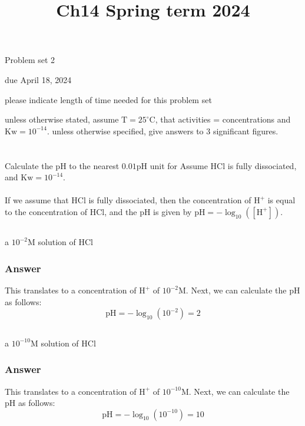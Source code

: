 \documentclass[12pt]{article}
\title{Ch14 Spring term 2024 }
\author{}
\date{}
\begin{document}
\maketitle
Problem set 2

due April 18, 2024

please indicate length of time needed for this problem set

unless otherwise stated, assume $\mathrm{T}=25^{\circ} \mathrm{C}$, that activities = concentrations and $\mathrm{Kw}=10^{-14}$. unless otherwise specified, give answers to 3 significant figures.
\section{}
Calculate the $\mathrm{pH}$ to the nearest $0.01 \mathrm{pH}$ unit for
Assume $\mathrm{HCl}$ is fully dissociated, and $\mathrm{Kw}=10^{-14}$.\\\\
If we assume that $\mathrm{HCl}$ is fully dissociated, then the concentration of $\mathrm{H}^{+}$ is equal to the concentration of $\mathrm{HCl}$, and the $\mathrm{pH}$ is given by $\mathrm{pH}=-\log _{10}\left(\left[\mathrm{H}^{+}\right]\right)$.
\subsection{}
a $10^{-2} \mathrm{M}$ solution of $\mathrm{HCl}$
\subsubsection{Answer}
This translates to a concentration of $\mathrm{H}^{+}$ of $10^{-2} \mathrm{M}$. Next, we can calculate the $\mathrm{pH}$ as follows:
\begin{equation}
  \mathrm{pH}=-\log _{10}\left(10^{-2}\right)=2
\end{equation}
\subsection{}
a $10^{-10} \mathrm{M}$ solution of $\mathrm{HCl}$
\subsubsection{Answer}
This translates to a concentration of $\mathrm{H}^{+}$ of $10^{-10} \mathrm{M}$. Next, we can calculate the $\mathrm{pH}$ as follows:
\begin{equation}
  \mathrm{pH}=-\log _{10}\left(10^{-10}\right)=10
\end{equation}
\end{document}
